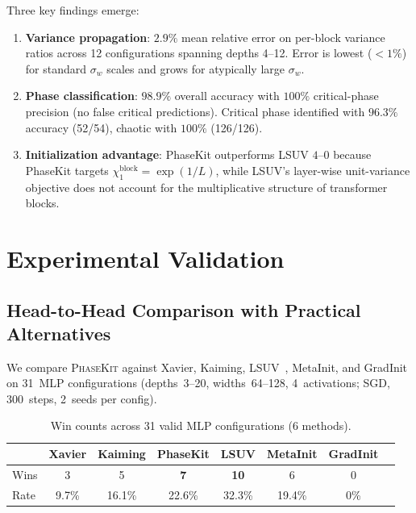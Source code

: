 \documentclass[10pt]{article}
\newcommand{\ToolName}{\textsc{PhaseKit}}
\begin{document}
Three key findings emerge:
\begin{enumerate}[nosep]
    \item \textbf{Variance propagation}: $2.9\%$ mean relative error on per-block variance ratios across 12 configurations spanning depths 4--12. Error is lowest ($<1\%$) for standard $\sigma_w$ scales and grows for atypically large $\sigma_w$.
    \item \textbf{Phase classification}: $98.9\%$ overall accuracy with $100\%$ critical-phase precision (no false critical predictions). Critical phase identified with $96.3\%$ accuracy (52/54), chaotic with $100\%$ (126/126).
    \item \textbf{Initialization advantage}: PhaseKit outperforms LSUV $4$--$0$ because PhaseKit targets $\chi_1^{\text{block}} = \exp(1/L)$, while LSUV's layer-wise unit-variance objective does not account for the multiplicative structure of transformer blocks.
\end{enumerate}

\section{Experimental Validation}
\label{sec:experiments}

\subsection{Head-to-Head Comparison with Practical Alternatives}
\label{sec:baseline-comparison}

We compare \ToolName{} against Xavier, Kaiming, LSUV~\cite{mishkin2016all}, MetaInit, and GradInit on 31~MLP configurations (depths~3--20, widths~64--128, 4~activations; SGD, 300~steps, 2~seeds per config).

\begin{table}[t]
\centering
\caption{Win counts across 31 valid MLP configurations (6 methods).}
\label{tab:baseline-wins}
\small
\begin{tabular}{@{}lccccccc@{}}
\toprule
& \textbf{Xavier} & \textbf{Kaiming} & \textbf{PhaseKit} & \textbf{LSUV} & \textbf{MetaInit} & \textbf{GradInit} \\
\midrule
Wins & 3 & 5 & \textbf{7} & \textbf{10} & 6 & 0 \\
Rate & 9.7\% & 16.1\% & 22.6\% & 32.3\% & 19.4\% & 0\% \\
\bottomrule
\end{tabular}
\end{table}
\end{document}
